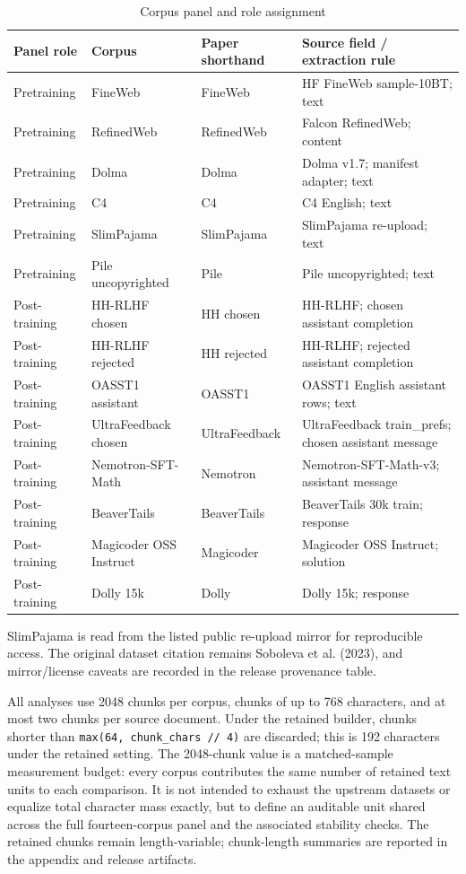 \documentclass[11pt]{article}
\begin{document}
\clearpage
\begingroup\small
\renewcommand{\arraystretch}{1.18}
\begin{longtable}{@{}L{0.13\textwidth}L{0.16\textwidth}L{0.13\textwidth}L{0.50\textwidth}@{}}
\caption{Corpus panel and role assignment}\label{tab:1}\\
\toprule\noalign{}
Panel role & Corpus & Paper shorthand & Source field / extraction rule \\
\midrule\noalign{}
\endhead
\bottomrule\noalign{}
\endlastfoot
Pretraining & FineWeb & FineWeb & HF FineWeb sample-10BT; text \\
Pretraining & RefinedWeb & RefinedWeb & Falcon RefinedWeb; content \\
Pretraining & Dolma & Dolma & Dolma v1.7; manifest adapter; text \\
Pretraining & C4 & C4 & C4 English; text \\
Pretraining & SlimPajama & SlimPajama & SlimPajama re-upload; text \\
Pretraining & Pile uncopyrighted & Pile & Pile uncopyrighted; text \\
Post-training & HH-RLHF chosen & HH chosen & HH-RLHF; chosen assistant completion \\
Post-training & HH-RLHF rejected & HH rejected & HH-RLHF; rejected assistant completion \\
Post-training & OASST1 assistant & OASST1 & OASST1 English assistant rows; text \\
Post-training & UltraFeedback chosen & UltraFeedback & UltraFeedback train\_prefs; chosen assistant message \\
Post-training & Nemotron-SFT-Math & Nemotron & Nemotron-SFT-Math-v3; assistant message \\
Post-training & BeaverTails & BeaverTails & BeaverTails 30k train; response \\
Post-training & Magicoder OSS Instruct & Magicoder & Magicoder OSS Instruct; solution \\
Post-training & Dolly 15k & Dolly & Dolly 15k; response \\
\end{longtable}
\endgroup

SlimPajama is read from the listed public re-upload mirror for reproducible access. The original dataset citation remains Soboleva et al. (2023), and mirror/license caveats are recorded in the release provenance table.

All analyses use 2048 chunks per corpus, chunks of up to 768 characters, and at most two chunks per source document. Under the retained builder, chunks shorter than \texttt{max(64,\ chunk\_chars\ //\ 4)} are discarded; this is 192 characters under the retained setting. The 2048-chunk value is a matched-sample measurement budget: every corpus contributes the same number of retained text units to each comparison. It is not intended to exhaust the upstream datasets or equalize total character mass exactly, but to define an auditable unit shared across the full fourteen-corpus panel and the associated stability checks. The retained chunks remain length-variable; chunk-length summaries are reported in the appendix and release artifacts.
\end{document}

